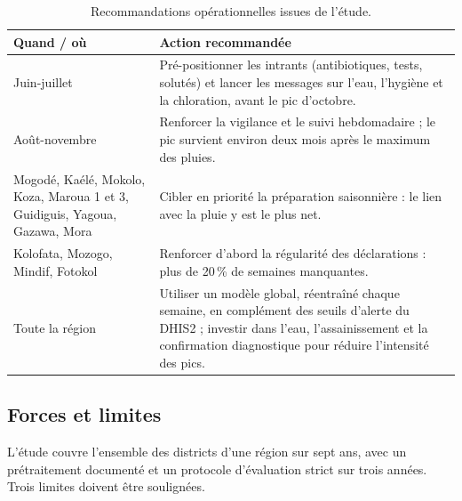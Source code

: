 \documentclass[11pt]{article}
\begin{document}
\begin{table}[!htbp]\centering\small
\caption{Recommandations opérationnelles issues de l'étude.}\label{tab:actions}
\begin{tabularx}{\linewidth}{@{}>{\raggedright\arraybackslash}p{4.3cm} L@{}}\toprule
Quand / où & Action recommandée \\\midrule
Juin-juillet & Pré-positionner les intrants (antibiotiques, tests, solutés) et lancer les messages sur l'eau, l'hygiène et la chloration, avant le pic d'octobre. \\
Août-novembre & Renforcer la vigilance et le suivi hebdomadaire ; le pic survient environ deux mois après le maximum des pluies. \\
Mogodé, Kaélé, Mokolo, Koza, Maroua 1 et 3, Guidiguis, Yagoua, Gazawa, Mora & Cibler en priorité la préparation saisonnière : le lien avec la pluie y est le plus net. \\
Kolofata, Mozogo, Mindif, Fotokol & Renforcer d'abord la régularité des déclarations : plus de 20\,\% de semaines manquantes. \\
Toute la région & Utiliser un modèle global, réentraîné chaque semaine, en complément des seuils d'alerte du DHIS2 ; investir dans l'eau, l'assainissement et la confirmation diagnostique pour réduire l'intensité des pics. \\\bottomrule
\end{tabularx}
\end{table}

\subsection{Forces et limites}
L'étude couvre l'ensemble des districts d'une région sur sept ans, avec un prétraitement documenté et un protocole d'évaluation strict sur trois années. Trois limites doivent être soulignées.
\end{document}

